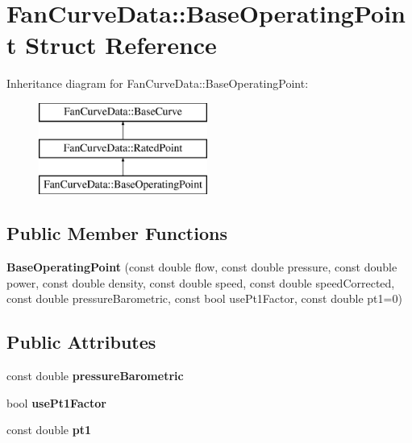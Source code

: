\hypertarget{struct_fan_curve_data_1_1_base_operating_point}{}\section{Fan\+Curve\+Data\+:\+:Base\+Operating\+Point Struct Reference}
\label{struct_fan_curve_data_1_1_base_operating_point}
Inheritance diagram for Fan\+Curve\+Data\+:\+:Base\+Operating\+Point\+:\begin{figure}[H]
\begin{center}
\leavevmode
\includegraphics[height=3.000000cm]{d2/da0/struct_fan_curve_data_1_1_base_operating_point}
\end{center}
\end{figure}
\subsection*{Public Member Functions}
\begin{DoxyCompactItemize}
\item 
\mbox{\label{struct_fan_curve_data_1_1_base_operating_point_a0260135ed464bc91143c620a1eeed78d}} 
{\bfseries Base\+Operating\+Point} (const double flow, const double pressure, const double power, const double density, const double speed, const double speed\+Corrected, const double pressure\+Barometric, const bool use\+Pt1\+Factor, const double pt1=0)
\end{DoxyCompactItemize}
\subsection*{Public Attributes}
\begin{DoxyCompactItemize}
\item 
\mbox{\label{struct_fan_curve_data_1_1_base_operating_point_ab66cd337152255bf82b7ef98f828144b}} 
const double {\bfseries pressure\+Barometric}
\item 
\mbox{\label{struct_fan_curve_data_1_1_base_operating_point_a4d09155765f22458b9feb10d77a188de}} 
bool {\bfseries use\+Pt1\+Factor}
\item 
\mbox{\label{struct_fan_curve_data_1_1_base_operating_point_ab349de155902de5f1a2c6dc6f48191b3}} 
const double {\bfseries pt1}
\end{DoxyCompactItemize}
